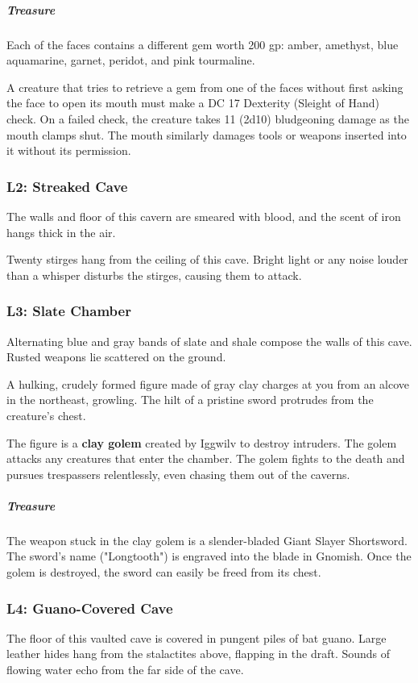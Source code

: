 \documentclass[10pt,a4paper,twoside,bg=print,twocolumn,openany,nodeprecatedcode]{dndbook}
\begin{document}
\subparagraph{Treasure}
Each of the faces contains a different gem worth 200 gp: amber, amethyst, blue aquamarine, garnet, peridot, and pink tourmaline.

A creature that tries to retrieve a gem from one of the faces without first asking the face to open its mouth must make a DC 17 Dexterity (Sleight of Hand) check. On a failed check, the creature takes 11 (2d10) bludgeoning damage as the mouth clamps shut. The mouth similarly damages tools or weapons inserted into it without its permission.

\subsubsection{L2: Streaked Cave}
\begin{DndReadAloud}{}
The walls and floor of this cavern are smeared with blood, and the scent of iron hangs thick in the air.

\end{DndReadAloud}

Twenty stirges hang from the ceiling of this cave. Bright light or any noise louder than a whisper disturbs the stirges, causing them to attack.

\subsubsection{L3: Slate Chamber}
\begin{DndReadAloud}{}
Alternating blue and gray bands of slate and shale compose the walls of this cave. Rusted weapons lie scattered on the ground.

A hulking, crudely formed figure made of gray clay charges at you from an alcove in the northeast, growling. The hilt of a pristine sword protrudes from the creature's chest.

\end{DndReadAloud}

The figure is a \textbf{clay golem} created by Iggwilv to destroy intruders. The golem attacks any creatures that enter the chamber. The golem fights to the death and pursues trespassers relentlessly, even chasing them out of the caverns.

\subparagraph{Treasure}
The weapon stuck in the clay golem is a slender-bladed Giant Slayer Shortsword. The sword's name ("Longtooth") is engraved into the blade in Gnomish. Once the golem is destroyed, the sword can easily be freed from its chest.

\subsubsection{L4: Guano-Covered Cave}
\begin{DndReadAloud}{}
The floor of this vaulted cave is covered in pungent piles of bat guano. Large leather hides hang from the stalactites above, flapping in the draft. Sounds of flowing water echo from the far side of the cave.

\end{DndReadAloud}
\end{document}
